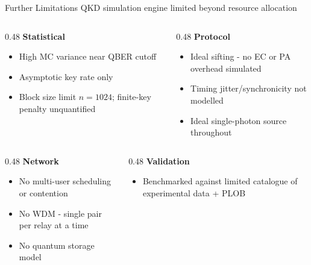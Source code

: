 \documentclass[10pt]{beamer}
\begin{document}
\begin{frame}{Further Limitations}
    QKD simulation engine limited beyond resource allocation

    \vspace{0.3cm}
    \begin{columns}[T]
        \begin{column}{0.48\textwidth}
            \textbf{Statistical}
            \begin{itemize}\scriptsize
                \item High MC variance near QBER cutoff
                \item Asymptotic key rate only
                \item Block size limit $n{=}1024$; finite-key penalty unquantified
            \end{itemize}
        \end{column}
        \begin{column}{0.48\textwidth}
            \textbf{Protocol}
            \begin{itemize}\scriptsize
                \item Ideal sifting - no EC or PA overhead simulated
                \item Timing jitter/synchronicity not modelled
                \item Ideal single-photon source throughout
            \end{itemize}
        \end{column}
    \end{columns}

    \vspace{0.4cm}
    \begin{columns}[T]
        \begin{column}{0.48\textwidth}
            \textbf{Network}
            \begin{itemize}\scriptsize
                \item No multi-user scheduling or contention
                \item No WDM - single pair per relay at a time
                \item No quantum storage model
            \end{itemize}
        \end{column}
        \begin{column}{0.48\textwidth}
            \textbf{Validation}
            \begin{itemize}\scriptsize
                \item Benchmarked against limited catalogue of experimental data + PLOB
            \end{itemize}
        \end{column}
    \end{columns}
\end{frame}
\end{document}

